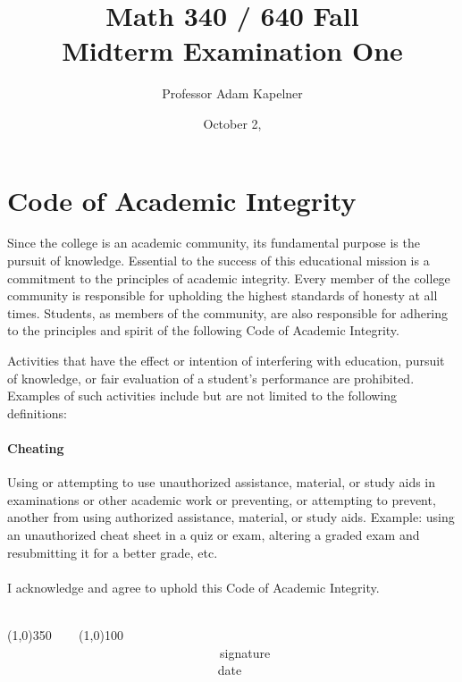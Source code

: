 \documentclass[12pt]{article}
\title{Math 340 / 640 Fall \the\year{} \\ Midterm Examination One}
\author{Professor Adam Kapelner}
\date{October 2, \the\year{}}
\begin{document}
\maketitle


\thispagestyle{empty}

\section*{Code of Academic Integrity}

\footnotesize
Since the college is an academic community, its fundamental purpose is the pursuit of knowledge. Essential to the success of this educational mission is a commitment to the principles of academic integrity. Every member of the college community is responsible for upholding the highest standards of honesty at all times. Students, as members of the community, are also responsible for adhering to the principles and spirit of the following Code of Academic Integrity.

Activities that have the effect or intention of interfering with education, pursuit of knowledge, or fair evaluation of a student's performance are prohibited. Examples of such activities include but are not limited to the following definitions:

\paragraph{Cheating} Using or attempting to use unauthorized assistance, material, or study aids in examinations or other academic work or preventing, or attempting to prevent, another from using authorized assistance, material, or study aids. Example: using an unauthorized cheat sheet in a quiz or exam, altering a graded exam and resubmitting it for a better grade, etc.\\
\\
\noindent I acknowledge and agree to uphold this Code of Academic Integrity. \\~\\

\begin{center}
\line(1,0){350} ~~~ \line(1,0){100}\\
~~~~~~~~~~~~~~~~~~~~~~~~~~~~~~~~~~signature~~~~~~~~~~~~~~~~~~~~~~~~~~~~~~~~~~~~~~~~~~~~~~~~~~~~~~~~~~~~~~ date
\end{center}

\normalsize
\end{document}
